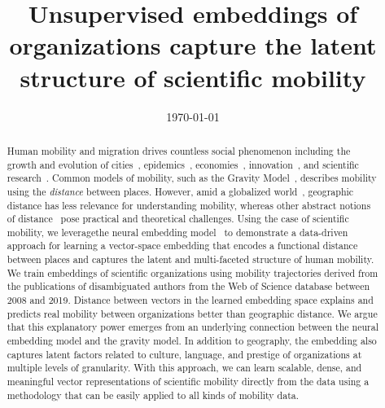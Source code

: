 \documentclass[12pt]{article} %
\begin{document}

\title{Unsupervised embeddings of organizations capture the latent structure of scientific mobility} %
\date{\today}
\maketitle %

%
%

\begin{abstract}


Human mobility and migration drives countless social phenomenon including the growth and evolution of cities~\autocite{bettencourt2007cities, bettencourt2013cities, wef2017migration, curiel2018citygravity},  epidemics~\autocite{kraemer2020covid, truscott2012epidemicgravity, xia2005measlesgravity, hufnagel2004epidemics, eubank2004outbreaks}, economies~\autocite{kaluza2010cargo, kerr2011immigration, taylor2016refugees, pappalardo2015mobility}, innovation~\autocite{braunerhjelm2020labor, kaiser2018innovation, armano2017innovation, liu2010spillovers},  and scientific research~\autocite{sugimoto2017mostimpact, petersen2018multiscale, jonkers2013return, franzoni2014advantage, morgan2018prestige, rodrigues2016mobility}. 
Common models of mobility, such as the Gravity Model~\autocite{zipf1946gravity, xia2005measlesgravity, jung2008highwaygravity, barbosa2018human, curiel2018citygravity, lewer2008immigrationgravity, hong2016busgravity, truscott2012epidemicgravity, xia2005measlesgravity, simini2012universal}, describes mobility using the \textit{distance} between places.
However, amid a globalized world~\autocite{czaika2018migration, czaika2018globalisation, buchan2009globalization}, geographic distance has less relevance for understanding mobility, whereas other abstract notions of distance~\autocite{boschma2005proximity} pose practical and theoretical challenges.
Using the case of scientific mobility, we leveragethe neural embedding model~\autocite{mikolov2013word2vec} to demonstrate a data-driven approach for learning a vector-space embedding that encodes a functional distance~\autocite{brown1970migration, brown1970functional, kim2018functional} between places and captures the latent and multi-faceted structure of human mobility.
We train embeddings of scientific organizations using mobility trajectories derived from the publications of disambiguated authors from the Web of Science database between 2008 and 2019.
Distance between vectors in the learned embedding space explains and predicts real mobility between organizations better than  geographic distance. 
We argue that this explanatory power emerges from an underlying connection between the neural embedding model and the gravity model.
In addition to geography, the embedding also captures latent factors related to culture, language, and prestige of organizations at multiple levels of granularity.
With this approach, we can learn scalable, dense, and meaningful vector representations of scientific mobility directly from the data using a methodology that can be easily applied to all kinds of mobility data.
\end{abstract}
\end{document}
